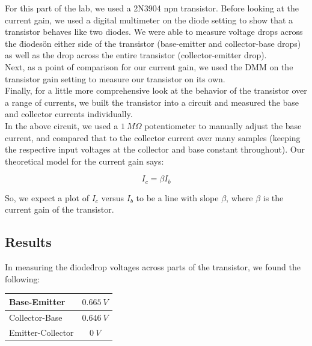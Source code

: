 \documentclass[11pt]{article}
\begin{document}
For this part of the lab, we used a 2N3904 npn transistor. Before looking at the current gain, we used a digital multimeter on the diode setting to show that a transistor behaves like two diodes. We were able to measure voltage drops across the \"diodes\" on either side of the transistor (base-emitter and collector-base drops) as well as the drop across the entire transistor (collector-emitter drop).\\

Next, as a point of comparison for our current gain, we used the DMM on the transistor gain setting to measure our transistor on its own.\\

Finally, for a little more comprehensive look at the behavior of the transistor over a range of currents, we built the transistor into a circuit and measured the base and collector currents individually.\\

In the above circuit, we used a $1\ M \Omega$ potentiometer to manually adjust the base current, and compared that to the collector current over many samples (keeping the respective input voltages at the collector and base constant throughout). Our theoretical model for the current gain says:

\begin{equation}
I_c = \beta I_b
\end{equation} 

So, we expect a plot of $I_c$ versus $I_b$ to be a line with slope $\beta$, where $\beta$ is the current gain of the transistor.\\

\subsection{Results}

In measuring the \"diode\" drop voltages across parts of the transistor, we found the following: \\

\begin{center}
    \begin{tabular}[H]{ | l | c | }
        \hline
        Base-Emitter & $0.665\ V$ \\ \hline
        Collector-Base & $0.646\ V$ \\ \hline
        Emitter-Collector & $0\ V$ \\ \hline
    \end{tabular}
\end{center}
\end{document}
